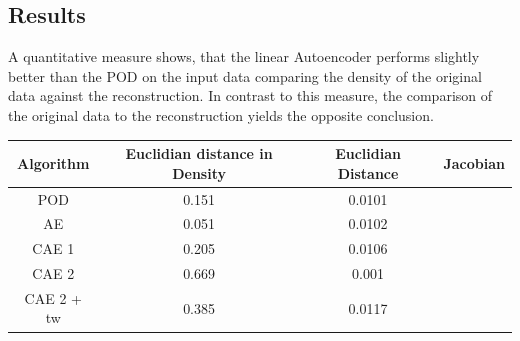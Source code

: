\documentclass[12pt, a4paper]{article}
\begin{document}
\subsection{Results}
A quantitative measure shows, that the linear Autoencoder performs slightly better than the POD on the input data comparing the density of the original data against the reconstruction. In contrast to this measure, the comparison of the original data to the reconstruction yields the opposite conclusion. 
\begin{center}
\begin{tabular}{ |c|c|c|c| } 
	\hline
	Algorithm & Euclidian distance in Density & Euclidian Distance & Jacobian \\ \hline
	POD & 0.151 & 0.0101 &\\ 
	AE & 0.051 & 0.0102 &\\ 
	CAE 1 & 0.205 & 0.0106 & \\
	CAE 2 & 0.669 & 0.001 & \\
	CAE 2 + tw & 0.385 & 0.0117 & \\
	\hline
\end{tabular}
\end{center}
\end{document}
